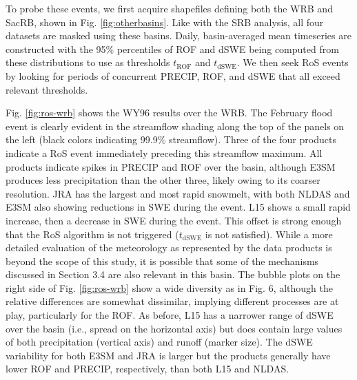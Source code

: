 \documentclass{article}
\begin{document}
To probe these events, we first acquire shapefiles defining both the WRB and SacRB, shown in Fig. \ref{fig:otherbasins}.
Like with the SRB analysis, all four datasets are masked using these basins.
Daily, basin-averaged mean timeseries are constructed with the 95\% percentiles of ROF and dSWE being computed from these distributions to use as thresholds $t_{\textrm{ROF}}$ and $t_{\textrm{dSWE}}$.
We then seek RoS events by looking for periods of concurrent PRECIP, ROF, and dSWE that all exceed relevant thresholds.

Fig. \ref{fig:ros-wrb} shows the WY96 results over the WRB. The February flood event is clearly evident in the streamflow shading along the top of the panels on the left (black colors indicating 99.9\% streamflow).
Three of the four products indicate a RoS event immediately preceding this streamflow maximum.
All products indicate spikes in PRECIP and ROF over the basin, although E3SM produces less precipitation than the other three, likely owing to its coarser resolution.
JRA has the largest and most rapid snowmelt, with both NLDAS and E3SM also showing reductions in SWE during the event.
L15 shows a small rapid increase, then a decrease in SWE during the event.
This offset is strong enough that the RoS algorithm is not triggered ($t_{\textrm{dSWE}}$ is not satisfied).
While a more detailed evaluation of the meteorology as represented by the data products is beyond the scope of this study, it is possible that some of the mechanisms discussed in Section 3.4 are also relevant in this basin.
The bubble plots on the right side of Fig. \ref{fig:ros-wrb} show a wide diversity as in Fig. 6, although the relative differences are somewhat dissimilar, implying different processes are at play, particularly for the ROF.
As before, L15 has a narrower range of dSWE over the basin (i.e., spread on the horizontal axis) but does contain large values of both precipitation (vertical axis) and runoff (marker size).
The dSWE variability for both E3SM and JRA is larger but the products generally have lower ROF and PRECIP, respectively, than both L15 and NLDAS.
\end{document}
